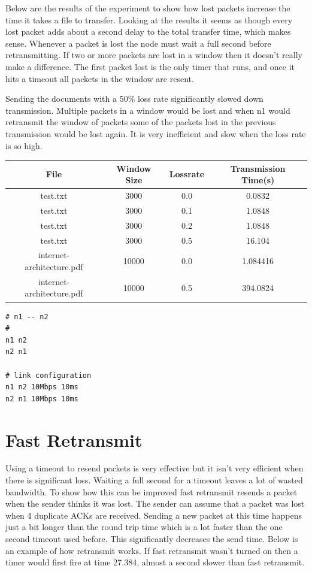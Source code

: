 \documentclass[fleqn,11pt]{article}
\begin{document}
Below are the results of the experiment to show how lost packets increase the time it takes a file to transfer.
Looking at the results it seems as though every lost packet adds about a second delay to the total transfer time, which makes sense.
Whenever a packet is lost the node must wait a full second before retransmitting.
If two or more packets are lost in a window then it doesn't really make a difference. 
The first packet lost is the only timer that runs, and once it hits a timeout all packets in the window are resent.

Sending the documents with a 50\% loss rate significantly slowed down transmission. 
Multiple packets in a window would be lost and when n1 would retransmit the window of packets some of the packets lost in the previous transmission would be lost again.
It is very inefficient and slow when the loss rate is so high. 

 
\vspace{0.5cm}
\begin{tabular}{cccc}
  \toprule
  File & Window Size & Lossrate & Transmission Time(s)\\
  \midrule
  test.txt & 3000 & 0.0 & 0.0832\\
  test.txt & 3000 & 0.1 & 1.0848\\
  test.txt & 3000 & 0.2 & 1.0848\\
  test.txt & 3000 & 0.5 & 16.104\\
  internet-architecture.pdf & 10000 & 0.0 & 1.084416\\
  internet-architecture.pdf & 10000 & 0.5 & 394.0824\\
  \bottomrule
\end{tabular}

\begin{lstlisting}[title={Network Configuration for Basic Tests}]
# n1 -- n2
#
n1 n2
n2 n1

# link configuration
n1 n2 10Mbps 10ms
n2 n1 10Mbps 10ms
\end{lstlisting}

\vspace{0.5cm}

\section{Fast Retransmit}

Using a timeout to resend packets is very effective but it isn't very efficient when there is significant loss. 
Waiting a full second for a timeout leaves a lot of wasted bandwidth.
To show how this can be improved fast retransmit resends a packet when the sender thinks it was lost.
The sender can assume that a packet was lost when 4 duplicate ACKs are received.
Sending a new packet at this time happens just a bit longer than the round trip time which is a lot faster than the one second timeout used before.
This significantly decreases the send time. 
Below is an example of how retransmit works.
If fast retransmit wasn't turned on then a timer would first fire at time 27.384, almost a second slower than fast retransmit.
\end{document}
